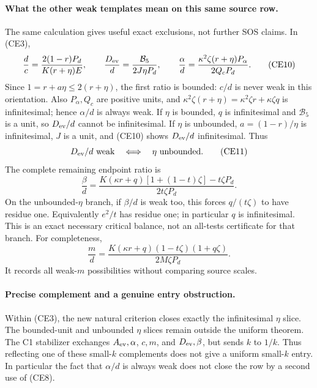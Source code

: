 \paragraph{What the other weak templates mean on this same source row.}
The same calculation gives useful exact exclusions, not further SOS
claims. In (CE3),
\[
 \frac dc=\frac{2(1-r)P_d}{K(r+\eta)E},\qquad
 \frac{D_{\rm ev}}d=\frac{\mathcal B_5}{2J\eta P_d},\qquad
 \frac\alpha d=\frac{\kappa^2\zeta(r+\eta)P_\alpha}{2Q_cP_d}.
                                                               \tag{CE10}
\]
Since $1=r+a\eta\le2(r+\eta)$, the first ratio is bounded:
$c/d$ is never weak in this orientation. Also $P_\alpha,Q_c$ are positive
units, and $\kappa^2\zeta(r+\eta)=\kappa^2\zeta r+\kappa\zeta q$
is infinitesimal; hence $\alpha/d$ is always weak.
If $\eta$ is bounded, $q$ is infinitesimal and $\mathcal B_5$ is a unit,
so $D_{\rm ev}/d$ cannot be infinitesimal. If $\eta$ is unbounded,
$a=(1-r)/\eta$ is infinitesimal, $J$ is a unit, and (CE10) shows
$D_{\rm ev}/d$ infinitesimal. Thus
\[
       D_{\rm ev}/d\text{ weak}\quad\Longleftrightarrow\quad
       \eta\text{ unbounded}.                         \tag{CE11}
\]
The complete remaining endpoint ratio is
\[
 \frac\beta d=
 \frac{K(\kappa r+q)[1+(1-t)\zeta]-t\zeta P_d}
      {2t\zeta P_d}.                                  \tag{CE12}
\]
On the unbounded-$\eta$ branch, if $\beta/d$ is weak too, this forces
$q/(t\zeta)$ to have residue one. Equivalently $e^2/t$ has residue one;
in particular $q$ is infinitesimal. This is an exact necessary critical
balance, not an all-tests certificate for that branch.
For completeness,
\[
 \frac md=\frac{K(\kappa r+q)(1-t\zeta)(1+q\zeta)}
                  {2M\zeta P_d}.                      \tag{CE13}
\]
It records all weak-$m$ possibilities without comparing source scales.

\paragraph{Precise complement and a genuine entry obstruction.}
Within (CE3), the new natural criterion closes exactly the infinitesimal
$\eta$ slice. The bounded-unit and unbounded $\eta$ slices remain outside
the uniform theorem. The C1 stabilizer exchanges $A_{\rm ev},\alpha$,
$c,m$, and $D_{\rm ev},\beta$, but sends $k$ to $1/k$. Thus reflecting
one of these small-$k$ complements does not give a uniform small-$k$
entry. In particular the fact that $\alpha/d$ is always weak does not
close the row by a second use of (CE8).

